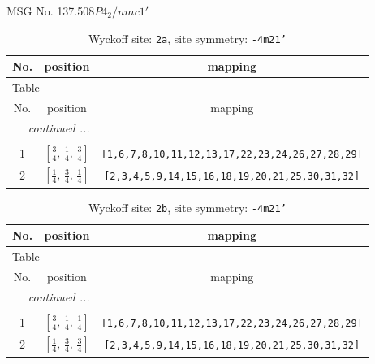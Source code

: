 \documentclass[fleqn,8pt]{jsarticle}
\begin{document}
\setcounter{MaxMatrixCols}{32}

\renewcommand{\tablename}{Table~}
\renewcommand{\figurename}{Figure~}
\begin{center}
\LARGE
MSG No. 137.508\quad$P4_{2}/nmc1'$
\end{center}
\renewcommand{\arraystretch}{1.2}
\begin{longtable}{ccc}
\caption{Wyckoff site: {\tt 2a}, site symmetry: {\tt -4m21'}}
 \\
 \hline \hline
No. & position & mapping \\ \hline \endfirsthead

\multicolumn{2}{l}{\tablename\ \thetable{}} \\
 \hline \hline
No. & position & mapping \\ \hline \endhead

 \hline \hline
\multicolumn{2}{r}{\footnotesize\it continued ...} \\ \endfoot

 \hline \hline
\multicolumn{2}{r}{} \\ \endlastfoot

1 & $\left[ \frac{3}{4},\, \frac{1}{4},\, \frac{3}{4} \right]$ & {\tt [1,6,7,8,10,11,12,13,17,22,23,24,26,27,28,29]} \\ \hline
2 & $\left[ \frac{1}{4},\, \frac{3}{4},\, \frac{1}{4} \right]$ & {\tt [2,3,4,5,9,14,15,16,18,19,20,21,25,30,31,32]} \\
\end{longtable}
\renewcommand{\arraystretch}{1.2}
\begin{longtable}{ccc}
\caption{Wyckoff site: {\tt 2b}, site symmetry: {\tt -4m21'}}
 \\
 \hline \hline
No. & position & mapping \\ \hline \endfirsthead

\multicolumn{2}{l}{\tablename\ \thetable{}} \\
 \hline \hline
No. & position & mapping \\ \hline \endhead

 \hline \hline
\multicolumn{2}{r}{\footnotesize\it continued ...} \\ \endfoot

 \hline \hline
\multicolumn{2}{r}{} \\ \endlastfoot

1 & $\left[ \frac{3}{4},\, \frac{1}{4},\, \frac{1}{4} \right]$ & {\tt [1,6,7,8,10,11,12,13,17,22,23,24,26,27,28,29]} \\ \hline
2 & $\left[ \frac{1}{4},\, \frac{3}{4},\, \frac{3}{4} \right]$ & {\tt [2,3,4,5,9,14,15,16,18,19,20,21,25,30,31,32]} \\
\end{longtable}
\end{document}
